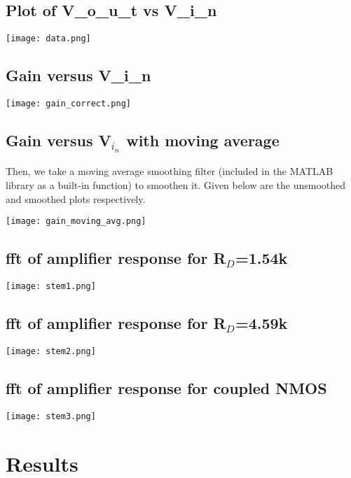 \documentclass[12pt]{article}
\begin{document}
\subsection*{Plot of V_o_u_t vs V_i_n}
\begin{center}
    \texttt{[image: data.png]}
\end{center}

\subsection*{Gain versus V_i_n }
\begin{center}
    \texttt{[image: gain\_correct.png]}
\end{center}

\subsection*{Gain versus V$_i_n$ with moving average }
Then, we take a moving average smoothing filter (included in the MATLAB library as a built-in function) to smoothen it. Given below are the unsmoothed and smoothed plots respectively.
\begin{center}
    \texttt{[image: gain\_moving\_avg.png]}
\end{center}

\subsection*{fft of amplifier response for R$_D$=1.54k\Omega}
\begin{center}
    \texttt{[image: stem1.png]}
\end{center}

\subsection*{fft of amplifier response for R$_D$=4.59k\Omega }
\begin{center}
    \texttt{[image: stem2.png]}
\end{center}

\subsection*{fft of amplifier response for coupled NMOS }
\begin{center}
    \texttt{[image: stem3.png]}
\end{center}


\section*{Results}
\end{document}
